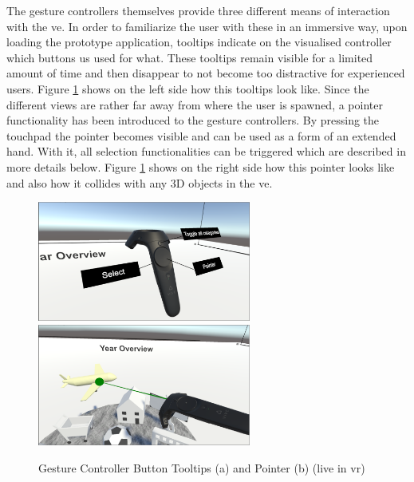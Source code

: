 The gesture controllers themselves provide three different means of interaction with the \gls{ve}. In order to familiarize the user with these in an immersive way, upon loading the prototype application, tooltips indicate on the visualised controller which buttons us used for what. These tooltips remain visible for a limited amount of time and then disappear to not become too distractive for experienced users. Figure \ref{fig:unitypointertooltips} shows on the left side how this tooltips look like. \newline
Since the different views are rather far away from where the user is spawned, a pointer functionality has been introduced to the gesture controllers. By pressing the touchpad the pointer becomes visible and can be used as a form of an extended hand. With it, all selection functionalities can be triggered which are described in more details below. Figure \ref{fig:unitypointertooltips} shows on the right side how this pointer looks like and also how it collides with any 3D objects in the \gls{ve}.
\begin{figure}[h]
	\begin{center}
		\includegraphics[width=7cm]{03_Figures/08_Development/Controller_Tooltips.png}
		\includegraphics[width=7cm]{03_Figures/08_Development/Controller_Pointer.png}
		\caption[Gesture Controller Button Tooltips and Pointer (live in \gls{vr})]{Gesture Controller Button Tooltips (a) and Pointer (b) (live in \gls{vr})}
		\label{fig:unitypointertooltips}
	\end{center}
\end{figure}

